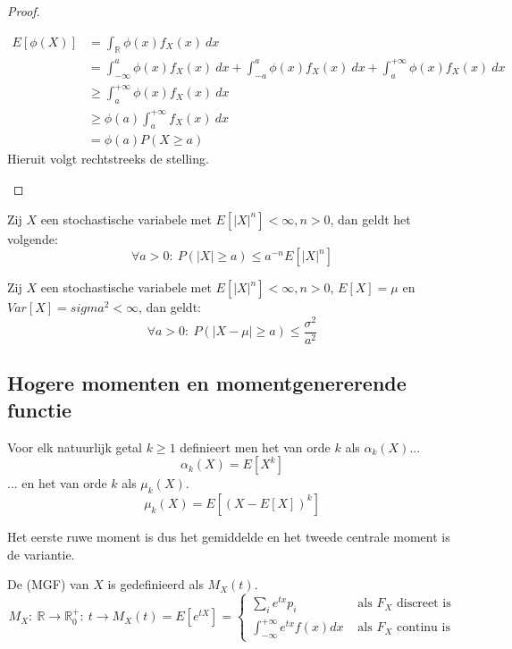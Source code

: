 \documentclass[main.tex]{subfiles}
\begin{document}
\begin{st}
\begin{proof}
\begin{itemize}
\begin{enumerate}
\begin{align*}
          E[\phi(X)]
          &= \int_{\mathbb{R}}\phi(x)f_{X}(x)\ dx\\
          &= \int_{-\infty}^{a}\phi(x)f_{X}(x)\ dx + \int_{-a}^{a}\phi(x)f_{X}(x)\ dx + \int_{a}^{+\infty}\phi(x)f_{X}(x)\ dx\\
          &\ge \int_{a}^{+\infty}\phi(x)f_{X}(x)\ dx\\
          &\ge \phi(a)\int_{a}^{+\infty}f_{X}(x)\ dx\\
          &= \phi(a)P(X \ge a)
        \end{align*}
        Hieruit volgt rechtstreeks de stelling.        
      \end{enumerate}
    \end{itemize}
  \end{proof}
\end{st}

\begin{gev}
  Zij $X$ een stochastische variabele met $E[|X|^{n}] < \infty, n>0$, dan geldt het volgende:
  \[ \forall a> 0:\ P(|X| \ge a) \le a^{-n}E[|X|^{n}] \]
\end{gev}
\begin{gev}
  Zij $X$ een stochastische variabele met $E[|X|^{n}] < \infty, n>0$, $E[X] = \mu$ en $Var[X] = sigma^{2} < \infty$, dan geldt:
  \[ \forall a > 0:\ P(|X-\mu| \ge a) \le \frac{\sigma^{2}}{a^{2}} \]
\end{gev}

\subsection{Hogere momenten en momentgenererende functie}
\label{sec:hogere-momenten-en}

\begin{de}
  Voor elk natuurlijk getal $k\ge 1$ definieert men het  van orde $k$ als $\alpha_{k}(X)$...
  \[ \alpha_{k}(X) =E[X^{k}] \]
  ... en het  van orde $k$ als $\mu_{k}(X)$.
  \[ \mu_{k}(X) = E[(X-E[X])^{k}] \]
\end{de}

\begin{opm}
  Het eerste ruwe moment is dus het gemiddelde en het tweede centrale moment is de variantie.
\end{opm}

\begin{de}
  De  (MGF) van $X$ is gedefinieerd als $M_{X}(t)$.
  \[
  M_{X}:\ \mathbb{R} \rightarrow \mathbb{R}^{+}_{0}:\ t \rightarrow M_{X}(t) = E[e^{tX}]
  = \left\{
    \begin{array}{cl}
      \sum_{i}e^{tx}p_{i} & \text{ als } F_{X} \text{ discreet is}\\
      \int_{-\infty}^{+\infty}e^{tx}f(x)dx & \text{ als } F_{X} \text{ continu is}
    \end{array}
    \right.
  \]
\end{de}
\end{document}
